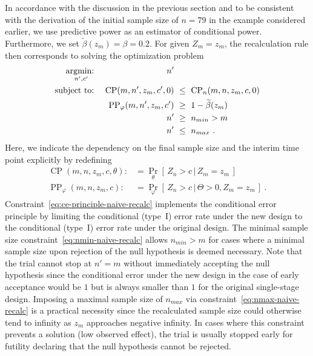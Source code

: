 \documentclass[12pt]{article}
\renewcommand{\Pr}{\operatorname{Pr}}
\newcommand{\st}{\operatorname{subject\ to:\ }}
\newcommand{\argmin}[1]{\operatornamewithlimits{argmin:\ }_{#1}}
\newcommand{\CP}{\ensuremath{\operatorname{CP}}}
\newcommand{\PP}{\ensuremath{\operatorname{PP}}}
\renewcommand{\Pr}{\ensuremath{\operatorname{Pr}}}
\newcommand{\cond}{\ensuremath{\,|\,}}
\begin{document}
In accordance with the discussion in the previous section
and to be consistent with the derivation of the
initial sample size of $n=79$ in the example considered earlier,
we use predictive power as an estimator of conditional power.
Furthermore, we set $\widetilde{\beta}(z_m)=\beta=0.2$.
For given $Z_m = z_m$, the recalculation rule then corresponds to solving
the optimization problem
\begin{align}
    \argmin{n', c'} &&                   n' & \label{eq:naive-recalc}\\
    \st             && \CP(m, n', z_m, c', 0) &\ \leq \ \CP_n(m, n, z_m, c, 0) \label{eq:ce-principle-naive-recalc} \\
                    &&    \PP_\varphi(m, n', z_m, c') &\ \geq \ 1 - \widetilde{\beta}(z_m) \\
                    &&                   n' &\ \geq \ n_{min} > m \label{eq:nmin-naive-recalc} \\
                    &&                   n' &\ \leq \ n_{max} \label{eq:nmax-naive-recalc} \ .
\end{align}
Here, we indicate the dependency on the
final sample size and the interim time point explicitly by redefining
\begin{align}
    \CP(m, n, z_m, c, \theta) :&= \Pr_\theta[\,Z_n > c \cond Z_m = z_m\,] \\
    \PP_\varphi(m, n, z_m, c) :&= \Pr_\varphi[\,Z_n > c \cond \Theta >0, Z_m = z_m\,] \ .
\end{align}
Constraint~\eqref{eq:ce-principle-naive-recalc} implements the conditional
error principle by limiting the conditional (type~I) error rate under the new design to
the conditional (type~I) error rate under the original design.
The minimal sample size constraint~\eqref{eq:nmin-naive-recalc} allows  $n_{min}>m$ for cases where a minimal sample size upon rejection of the null hypothesis is deemed necessary.
Note that the trial cannot stop at $n'=m$ without immediately accepting the
null hypothesis since the conditional error under the new design in the case of early acceptance would be $1$ but is always smaller than $1$ for the original single-stage design.
Imposing a maximal sample size of $n_{max}$ via constraint~\eqref{eq:nmax-naive-recalc} is a practical necessity since the
recalculated sample size could otherwise tend to infinity as $z_m$ approaches negative infinity.
In cases where this constraint prevents a solution (low observed effect),
the trial is usually stopped early for futility declaring that the null hypothesis cannot be rejected.
\end{document}
